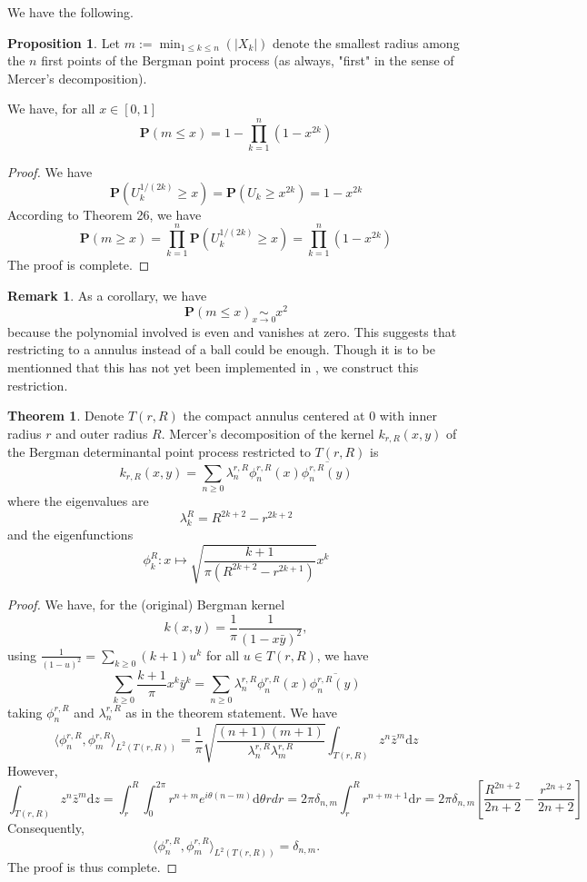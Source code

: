 \documentclass[11pt]{article}
\theoremstyle{plain}
\theoremstyle{definition}
\newtheorem{theorem}[definition]{Theorem}
\newtheorem{proposition}[definition]{Proposition}
\newtheorem{remark}[definition]{Remark}
\begin{document}
We have the following.

\begin{proposition} Let $m := \min_{1 \le k \le n} (|X_k|)$ denote the smallest radius among the $n$ first points of the Bergman point process (as always, "first" in the sense of Mercer's decomposition).

We have, for all $x \in [0,1]$
\[
\mathbf{P}(m \leqslant x) = 1 - \prod_{k=1}^n (1 - x^{2k})
\]
\end{proposition}

\begin{proof}

We have
\[
\mathbf{P}(U_k^{1/(2k)} \ge x) = \mathbf{P}(U_k \ge x^{2k}) = 1 - x^{2k}
\]
According to Theorem 26, we have
\[
\mathbf{P}(m \ge x) = \prod_{k=1}^n \mathbf{P}(U_k^{1/(2k)} \ge x) = \prod_{k=1}^n (1 - x^{2k})
\]
The proof is complete.
\end{proof}

\begin{remark} As a corollary, we have
\[
\mathbf{P}(m \leqslant x) \underset{x \to 0}{\sim} x^2
\]
because the polynomial involved is even and vanishes at zero. This suggests that restricting to a annulus instead of a ball could be enough. Though it is to be mentionned that this has not yet been implemented in \cite{MorozSoftware}, we construct this restriction.
\end{remark}

\begin{theorem} Denote $T(r,R)$ the compact annulus centered at 0 with inner radius $r$ and outer radius $R$. Mercer's decomposition of the kernel $k_{r,R}(x,y)$ of the Bergman determinantal point process restricted to $T(r,R)$ is
\[
k_{r,R}(x,y) = \sum_{n \ge 0} \lambda_n^{r,R} \phi_n^{r,R}(x) \overline{\phi_n^{r,R}(y)}
\]
where the eigenvalues are
\[
\lambda_k^R = R^{2k+2} - r^{2k+2}
\]
and the eigenfunctions
\[
\phi_k^R: x \mapsto \sqrt{\frac{k+1}{\pi(R^{2k+2} - r^{2k+1})}} x^k
\]
\end{theorem}

\begin{proof}
We have, for the (original) Bergman kernel
\[
k(x,y) = \frac{1}{\pi} \frac{1}{(1-x\bar{y})^2},
\]
using $\frac{1}{(1-u)^2} = \sum_{k \ge 0} (k+1)u^k$ for all $u \in T(r,R)$, we have
\[
\sum_{k \ge 0} \frac{k+1}{\pi} x^k \bar{y}^k = \sum_{n \ge 0} \lambda_n^{r,R} \phi_n^{r,R}(x) \overline{\phi_n^{r,R}(y)}
\]
taking $\phi_n^{r,R}$ and $\lambda_n^{r,R}$ as in the theorem statement. We have
\[
\langle \phi_n^{r,R}, \phi_m^{r,R} \rangle_{L^2(T(r,R))} = \frac{1}{\pi} \sqrt{\frac{(n+1)(m+1)}{\lambda_n^{r,R} \lambda_m^{r,R}}} \int_{T(r,R)} z^n \bar{z}^m \mathrm dz
\]
However,
\[
\int_{T(r,R)} z^n \bar{z}^m \mathrm dz = \int_r^R \int_0^{2\pi} r^{n+m} e^{i\theta(n-m)} \mathrm d\theta rdr = 2\pi \delta_{n,m} \int_r^R r^{n+m+1} \mathrm dr = 2\pi \delta_{n,m} \left[ \frac{R^{2n+2}}{2n+2} - \frac{r^{2n+2}}{2n+2} \right]
\]
Consequently,
\[
\langle \phi_n^{r,R}, \phi_m^{r,R} \rangle_{L^2(T(r,R))} = \delta_{n,m}.
\]
The proof is thus complete.
\end{proof}
\end{document}
